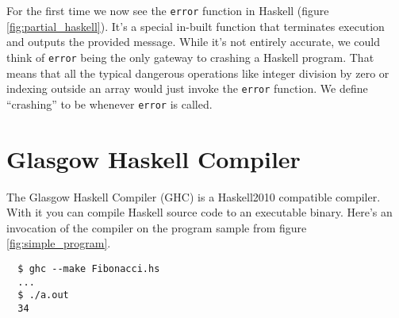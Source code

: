 \begin{figure}
\end{figure}

For the first time we now see the \texttt{error} function in Haskell (figure \ref{fig:partial_haskell}).  It's a
special in-built function that terminates execution and outputs the provided
message. While it's not entirely accurate, we could think of \texttt{error}
being the only gateway to crashing a Haskell program. That means that all the
typical dangerous operations like integer division by zero or indexing outside
an array would just invoke the \texttt{error} function. We define ``crashing''
to be whenever \texttt{error} is called.


\section{Glasgow Haskell Compiler}

The Glasgow Haskell Compiler (GHC) is a Haskell2010 compatible compiler.
\cite{ghc_website} With it you can compile Haskell source code to an executable
binary. Here's an invocation of the compiler on the program sample from figure \ref{fig:simple_program}.

\begin{verbatim}
  $ ghc --make Fibonacci.hs
  ...
  $ ./a.out
  34
\end{verbatim}

